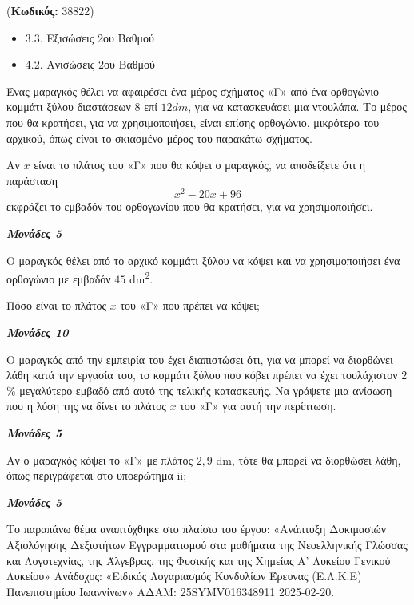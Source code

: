 \documentclass[11pt,a4paper,twoside]{book}
\newcounter{askhsh}[chapter]
\renewcommand{\theaskhsh}{
	\bf{\titlefont{\Large{\thechapter}}.\arabic{askhsh}}
}
\newcommand{\Askhsh}[2]{\refstepcounter{askhsh}{\titlefont{Άσκηση\theaskhsh} - \textcolor{maincolor}{ΘΕΜΑ #2}} ({\small{\textbf{Κωδικός:} #1}})\\}{}
\newenvironment{ylh}{
\begin{tcolorbox}[
breakable,
enhanced standard,
titlerule=0pt,
toprule=0pt, 
rightrule=0pt, 
bottomrule=0pt,
title={\titlefont Ύλη άσκησης},
colback=white,
opacityback=0,
left=2mm,
top=1mm,
bottom=0mm,
boxrule=0pt,
colframe=white,
borderline west={1.5mm}{0pt}{secondarycolor},
leftrule=2mm,
sharp corners,
coltitle=black
]
\begin{itemize}[leftmargin=3mm, itemsep=0mm, label=\textcolor{secondarycolor}{{\small\faBook}}]
}{
\end{itemize}
\end{tcolorbox}
}
\newcommand{\monades}[1]{
\hspace*{\fill}
\textbf{\textit{\textcolor{maincolor}{Μονάδες #1}}}}
\begin{document}
\vspace{4mm}
\Askhsh{38822}{4}
\begin{ylh}
    \item 3.3. Εξισώσεις 2ου Βαθμού
    \item 4.2. Ανισώσεις 2ου Βαθμού
\end{ylh}

Ένας μαραγκός θέλει να αφαιρέσει ένα μέρος σχήματος «Γ» από ένα ορθογώνιο κομμάτι ξύλου διαστάσεων $8$ επί $12dm$, για να κατασκευάσει μια ντουλάπα. Το μέρος που θα κρατήσει, για να χρησιμοποιήσει, είναι επίσης ορθογώνιο, μικρότερο του αρχικού, όπως είναι το σκιασμένο μέρος του παρακάτω σχήματος.


\begin{alist}
\item Αν $x$ είναι το πλάτος του «Γ» που θα κόψει ο μαραγκός, να αποδείξετε ότι η παράσταση
\begin{equation*}x^{2} - 20x + 96\end{equation*}
εκφράζει το εμβαδόν του ορθογωνίου που θα κρατήσει, για να χρησιμοποιήσει.
\monades{5}
\item Ο μαραγκός θέλει από το αρχικό κομμάτι ξύλου να κόψει και να χρησιμοποιήσει ένα ορθογώνιο με εμβαδόν $45$ dm\textsuperscript{2}.
\begin{rlist}
\item Πόσο είναι το πλάτος $x$ του «Γ» που πρέπει να κόψει;
\monades{10}
\item Ο μαραγκός από την εμπειρία του έχει διαπιστώσει ότι, για να μπορεί να διορθώνει λάθη κατά την εργασία του, το κομμάτι ξύλου που κόβει πρέπει να έχει τουλάχιστον $2$\% μεγαλύτερο εμβαδό από αυτό της τελικής κατασκευής. Να γράψετε μια ανίσωση που η λύση της να δίνει το πλάτος $x$ του «Γ» για αυτή την περίπτωση.
\monades{5}
\item Αν ο μαραγκός κόψει το «Γ» με πλάτος $2,9$ dm, τότε θα μπορεί να διορθώσει λάθη, όπως περιγράφεται στο υποερώτημα ii;
\monades{5}

{\footnotesize Το παραπάνω θέμα αναπτύχθηκε στο πλαίσιο του έργου: «Ανάπτυξη Δοκιμασιών Αξιολόγησης Δεξιοτήτων Εγγραμματισμού στα μαθήματα της Νεοελληνικής Γλώσσας και Λογοτεχνίας, της Άλγεβρας, της Φυσικής και της Χημείας Α' Λυκείου Γενικού Λυκείου» Ανάδοχος: «Ειδικός Λογαριασμός Κονδυλίων Έρευνας (Ε.Λ.Κ.Ε) Πανεπιστημίου Ιωαννίνων» ΑΔΑΜ: 25SYMV016348911 2025-02-20.}
\end{rlist}
\end{alist}
\end{document}
